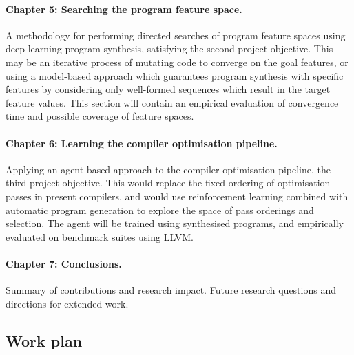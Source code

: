 \paragraph{Chapter 5: Searching the program feature space.} A methodology for performing directed searches of program feature spaces using deep learning program synthesis, satisfying the second project objective. This may be an iterative process of mutating code to converge on the goal features, or using a model-based approach which guarantees program synthesis with specific features by considering only well-formed sequences which result in the target feature values. This section will contain an empirical evaluation of convergence time and possible coverage of feature spaces.

\paragraph{Chapter 6: Learning the compiler optimisation pipeline.} Applying an agent based approach to the compiler optimisation pipeline, the third project objective. This would replace the fixed ordering of optimisation passes in present compilers, and would use reinforcement learning combined with automatic program generation to explore the space of pass orderings and selection. The agent will be trained using synthesised programs, and empirically evaluated on benchmark suites using LLVM.

\paragraph{Chapter 7: Conclusions.} Summary of contributions and research impact. Future research questions and directions for extended work.


\newpage
\subsection{Work plan}

